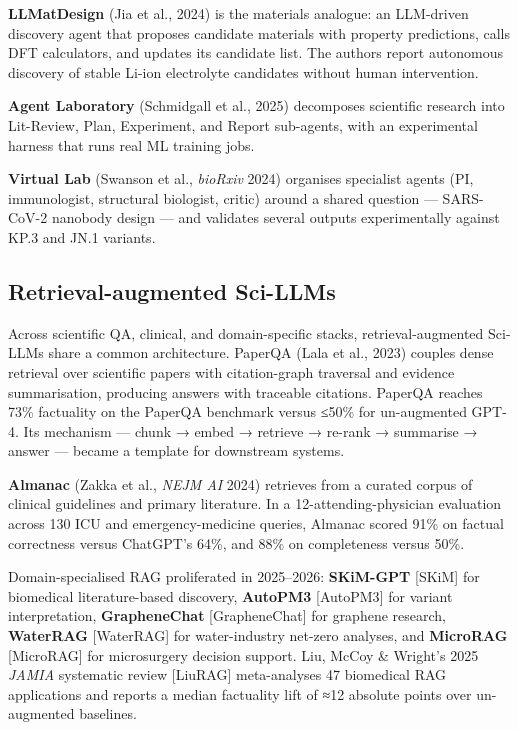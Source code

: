 \documentclass{article}
\begin{document}
\textbf{LLMatDesign} (Jia et al., 2024) \cite{jia2024arxiv2406131632024} is the materials analogue: an LLM-driven discovery agent that proposes candidate materials with property predictions, calls DFT calculators, and updates its candidate list. The authors report autonomous discovery of stable Li-ion electrolyte candidates without human intervention.

\textbf{Agent Laboratory} (Schmidgall et al., 2025) \cite{schmidgall2025agentlaboratoryusi} decomposes scientific research into Lit-Review, Plan, Experiment, and Report sub-agents, with an experimental harness that runs real ML training jobs.

\textbf{Virtual Lab} (Swanson et al., \emph{bioRxiv} 2024) \cite{swanson2024thevirtuallabaiage} organises specialist agents (PI, immunologist, structural biologist, critic) around a shared question --- SARS-CoV-2 nanobody design --- and validates several outputs experimentally against KP.3 and JN.1 variants.

\subsection{Retrieval-augmented Sci-LLMs}\label{retrieval-augmented-sci-llms}

Across scientific QA, clinical, and domain-specific stacks, retrieval-augmented Sci-LLMs share a common architecture. PaperQA (L\textquotesingle ala et al., 2023) \cite{ala2023arxiv2312075592023} couples dense retrieval over scientific papers with citation-graph traversal and evidence summarisation, producing answers with traceable citations. PaperQA reaches 73\% factuality on the PaperQA benchmark versus ≤50\% for un-augmented GPT-4. Its mechanism --- chunk → embed → retrieve → re-rank → summarise → answer --- became a template for downstream systems.

\textbf{Almanac} (Zakka et al., \emph{NEJM AI} 2024) \cite{zakka2024almanacretrievalau} retrieves from a curated corpus of clinical guidelines and primary literature. In a 12-attending-physician evaluation across 130 ICU and emergency-medicine queries, Almanac scored 91\% on factual correctness versus ChatGPT's 64\%, and 88\% on completeness versus 50\%.

Domain-specialised RAG proliferated in 2025--2026: \textbf{SKiM-GPT} {[}SKiM{]} for biomedical literature-based discovery, \textbf{AutoPM3} {[}AutoPM3{]} for variant interpretation, \textbf{GrapheneChat} {[}GrapheneChat{]} for graphene research, \textbf{WaterRAG} {[}WaterRAG{]} for water-industry net-zero analyses, and \textbf{MicroRAG} {[}MicroRAG{]} for microsurgery decision support. Liu, McCoy \& Wright's 2025 \emph{JAMIA} systematic review {[}LiuRAG{]} meta-analyses 47 biomedical RAG applications and reports a median factuality lift of ≈12 absolute points over un-augmented baselines.
\end{document}
